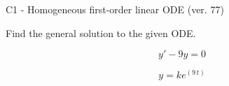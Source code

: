 \begin{exercise}
  \begin{exerciseTitle}C1 - Homogeneous first-order linear ODE (ver. 77)\end{exerciseTitle}
  \begin{exerciseStatement}
    
Find the general solution to the given ODE.

    
\[y'-9y=0\]

  \end{exerciseStatement}
  \begin{exerciseAnswer}
    
\[y= k e^{\left(9 \, t\right)}\]

  \end{exerciseAnswer}
\end{exercise}